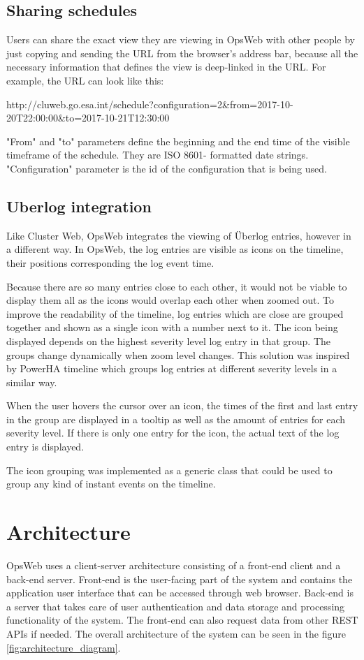 \subsection{Sharing schedules}
Users can share the exact view they are viewing in OpsWeb with other people by just copying and sending the URL from the browser's address bar, because all the necessary information that defines the view is deep-linked in the URL. For example, the URL can look like this:

http://cluweb.go.esa.int/schedule?configuration=2\&from=2017-10-20T22:00:00\&to=2017-10-21T12:30:00

"From" and "to" parameters define the beginning and the end time of the visible timeframe of the schedule. They are ISO 8601- formatted date strings. "Configuration" parameter is the id of the configuration that is being used.

\subsection{Uberlog integration}
Like Cluster Web, OpsWeb integrates the viewing of Überlog entries, however in a different way. In OpsWeb, the log entries are visible as icons on the timeline, their positions corresponding the log event time. 

Because there are so many entries close to each other, it would not be viable to display them all as the icons would overlap each other when zoomed out. To improve the readability of the timeline, log entries which are close are grouped together and shown as a single icon with a number next to it. The icon being displayed depends on the highest severity level log entry in that group. The groups change dynamically when zoom level changes. This solution was inspired by PowerHA timeline \cite{ibm_timeline} which groups log entries at different severity levels in a similar way.

When the user hovers the cursor over an icon, the times of the first and last entry in the group are displayed in a tooltip as well as the amount of entries for each severity level. If there is only one entry for the icon, the actual text of the log entry is displayed.

The icon grouping was implemented as a generic class that could be used to group any kind of instant events on the timeline.
\section{Architecture}
OpsWeb uses a client-server architecture consisting of a front-end client and a back-end server. Front-end is the user-facing part of the system and contains the application user interface that can be accessed through web browser. Back-end is a server that takes care of user authentication and data storage and processing functionality of the system. The front-end can also request data from other REST APIs if needed. The overall architecture of the system can be seen in the figure \ref{fig:architecture_diagram}.

